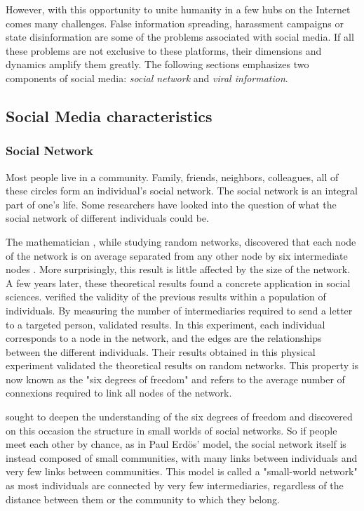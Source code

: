 However, with this opportunity to unite humanity in a few hubs on the Internet comes many challenges.
False information spreading, harassment campaigns or state disinformation are some of the problems associated with social media.
If all these problems are not exclusive to these platforms, their dimensions and dynamics amplify them greatly.
The following sections emphasizes two components of social media: \emph{social network} and \emph{viral information}.

\subsection{Social Media characteristics}
\subsubsection{Social Network}
Most people live in a community.
Family, friends, neighbors, colleagues, all of these circles form an individual's social network.
The social network is an integral part of one's life.
Some researchers have looked into the question of what the social network of different individuals could be.

The mathematician \citeauthor{erdosEvolutionRandomGraphs1960}, while studying random networks, discovered that each node of the network is on average separated from any other node by six intermediate nodes \parencite{erdosEvolutionRandomGraphs1960}.
More surprisingly, this result is little affected by the size of the network.
A few years later, these theoretical results found a concrete application in social sciences.
\textcite{milgramSmallWorldProblem1967} verified the validity of the previous results within a population of individuals.
By measuring the number of intermediaries required to send a letter to a targeted person, \citeauthor{milgramSmallWorldProblem1967} validated \citeauthor{erdosEvolutionRandomGraphs1960} results.
In this experiment, each individual corresponds to a node in the network, and the edges are the relationships between the different individuals.
Their results obtained in this physical experiment validated the theoretical results on random networks.
This property is now known as the "six degrees of freedom" and refers to the average number of connexions required to link all nodes of the network.

\textcite{wattsCollectiveDynamicsSmallworld1998} sought to deepen the understanding of the six degrees of freedom and discovered on this occasion the structure in small worlds of social networks.
So if people meet each other by chance, as in Paul Erdös' model, the social network itself is instead composed of small communities, with many links between individuals
and very few links between communities.
This model is called a "small-world network" as most individuals are connected by very few intermediaries, regardless of the distance between them or the community to which they belong.

